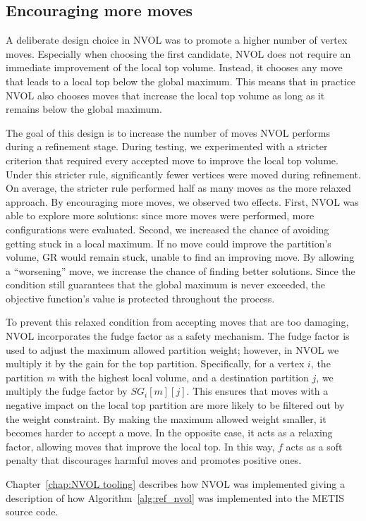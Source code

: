 \subsection{Encouraging more moves}\label{sec:encourage more moves}
A deliberate design choice in NVOL was to promote a higher number of vertex moves. Especially when choosing the first candidate, NVOL does not require an immediate improvement of the local top volume. Instead, it chooses any move that leads to a local top below the global maximum. This means that in practice NVOL also chooses moves that increase the local top volume as long as it remains below the global maximum.

The goal of this design is to increase the number of moves NVOL performs during a refinement stage. During testing, we experimented with a stricter criterion that required every accepted move to improve the local top volume. Under this stricter rule, significantly fewer vertices were moved during refinement. On average, the stricter rule performed half as many moves as the more relaxed approach. By encouraging more moves, we observed two effects. First, NVOL was able to explore more solutions: since more moves were performed, more configurations were evaluated. Second, we increased the chance of avoiding getting stuck in a local maximum. If no move could improve the partition's volume, GR would remain stuck, unable to find an improving move. By allowing a ``worsening'' move, we increase the chance of finding better solutions. Since the condition still guarantees that the global maximum is never exceeded, the objective function's value is protected throughout the process.

To prevent this relaxed condition from accepting moves that are too damaging, NVOL incorporates the fudge factor as a safety mechanism. The fudge factor is used to adjust the maximum allowed partition weight; however, in NVOL we multiply it by the gain for the top partition. Specifically, for a vertex $i$, the partition $m$ with the highest local volume, and a destination partition $j$, we multiply the fudge factor by $SG_i[m][j]$. This ensures that moves with a negative impact on the local top partition are more likely to be filtered out by the weight constraint. By making the maximum allowed weight smaller, it becomes harder to accept a move. In the opposite case, it acts as a relaxing factor, allowing moves that improve the local top. In this way, $f$ acts as a soft penalty that discourages harmful moves and promotes positive ones.

Chapter~\ref{chap:NVOL tooling} describes how NVOL was implemented giving a description of how Algorithm~\ref{alg:ref_nvol} was implemented into the METIS source code.